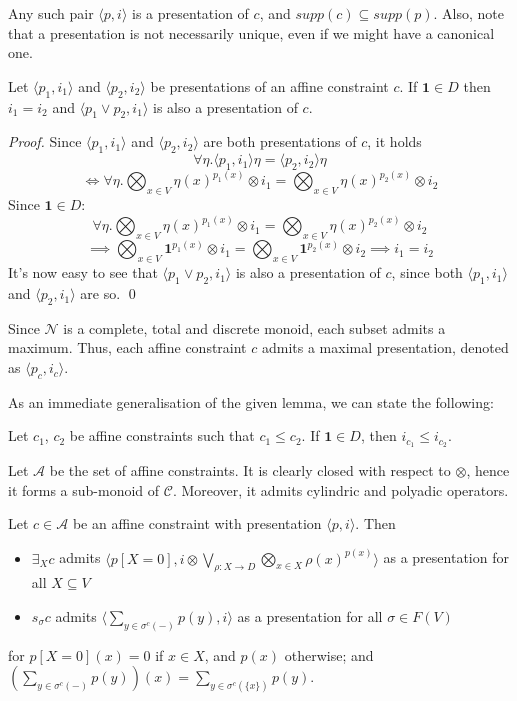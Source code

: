 \documentclass{llncs}
\def\monid{{\mathbf 0}}
\def\1{{\mathbf 1}}
\def\monid{\mathbf{1}}
\begin{document}
Any such pair $\langle p, i \rangle$ is a presentation of $c$, and 
$supp(c) \subseteq supp(p)$.
Also, note that a presentation is not necessarily unique,
even if we might have a canonical one.

\begin{lemma}
Let $\langle p_1, i_1 \rangle$ and  $\langle p_2, i_2 \rangle$
be presentations of an affine constraint $c$. If $\1 \in D$ then
$i_1 = i_2$ and $\langle p_1\vee p_2, i_1\rangle$ is 
also a presentation of $c$.
\end{lemma}
\begin{proof}
Since $\langle p_1, i_1 \rangle$ and $\langle p_2, i_2 \rangle$ are both presentations of $c$, it holds 
\[ \forall \eta. \langle p_1, i_1 \rangle \eta = \langle p_2, i_2 \rangle \eta \] 
\[ \iff \forall \eta. \bigotimes_{x \in V} \eta(x)^{p_1(x)} \otimes i_1 = \bigotimes_{x \in V} \eta(x)^{p_2(x)} \otimes i_2 \]
Since $\monid \in D$:
\[ \forall \eta. \bigotimes_{x \in V} \eta(x)^{p_1(x)} \otimes i_1 = \bigotimes_{x \in V} \eta(x)^{p_2(x)} \otimes i_2 \]
\[ \implies \bigotimes_{x \in V} \monid^{p_1(x)} \otimes i_1 = \bigotimes_{x \in V} \monid^{p_2(x)} \otimes i_2 \implies i_1 = i_2 \]
It's now easy to see that $\langle p_1 \vee p_2, i_1 \rangle$ is also a presentation of $c$, since both $\langle p_1, i_1 \rangle$ and $\langle p_2, i_1 \rangle$ are so.
\qed
\end{proof}

Since $\mathcal{N}$ is a complete, total and discrete monoid, 
each subset admits a maximum. 
Thus, each affine constraint $c$ admits a
maximal presentation, denoted as 
$\langle p_c, i_c\rangle$.

\medskip
As an immediate generalisation of the given lemma, we can state the following:
\begin{lemma}
Let $c_1$, $c_2$ be affine constraints
such that $c_1 \leq c_2$.
If $\1 \in D$, then $i_{c_1} \leq i_{c_2}$.
\end{lemma}

Let $\mathcal{A}$ be the set of affine constraints.
It is clearly closed with respect to $\otimes$, 
hence it forms a sub-monoid of $\mathcal{C}$.
Moreover, it admits cylindric and polyadic operators.

\begin{lemma}
Let $c \in \mathcal{A}$ be an affine constraint with presentation $\langle p, i \rangle$.
Then 
	\begin{itemize}
		\item  $\exists_X c$ admits $\langle p[X = 0], i \otimes \bigvee_{\rho: X \rightarrow D} \bigotimes_{x \in X} \rho(x)^{p(x)} \rangle$
		          as a presentation for all $X \subseteq V$
		\item  $s_\sigma c$ admits $\langle \sum_{y \in \sigma^c(-)}p(y), i \rangle$ as a presentation
		          for all $\sigma \in F(V)$
	\end{itemize}
for $p[X=0](x) = 0$ if $x \in X$, and $p(x)$ otherwise; and $(\sum_{y \in \sigma^c(-)}p(y))(x) = \sum_{y \in \sigma^c(\{x\})}p(y)$.
\end{lemma}
\end{document}
